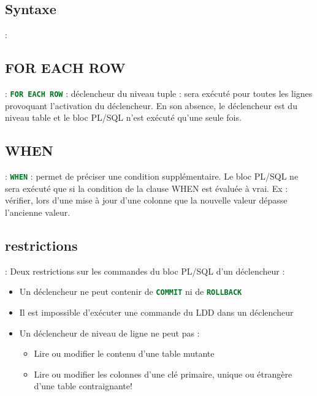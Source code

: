 \documentclass[10pt]{beamer}
\begin{document}
\subsection{Syntaxe}
\begin{frame}{\secname : \subsecname}
    
\end{frame}
\subsection{FOR EACH ROW}
\begin{frame}{\secname : \subsecname}
    \lstinline[language=sql]!FOR EACH ROW! : déclencheur du niveau tuple : sera exécuté pour toutes les lignes provoquant l'activation du déclencheur.  En son absence, le déclencheur est du niveau table et le bloc PL/SQL n'est exécuté qu'une seule fois.
\end{frame}

\subsection{WHEN}
\begin{frame}{\secname : \subsecname}
    \lstinline[language=sql]!WHEN! : permet de préciser une condition supplémentaire. Le bloc PL/SQL ne sera exécuté que si la condition de la clause WHEN est évaluée à vrai.
    Ex : vérifier, lors d'une mise à jour d'une colonne que la nouvelle valeur dépasse l'ancienne valeur.
\end{frame}

\subsection{restrictions}
\begin{frame}{\secname : \subsecname}
    Deux restrictions sur les commandes du bloc PL/SQL d'un déclencheur :
    \begin{itemize}
        \item Un déclencheur ne peut contenir de \lstinline[language=sql]!COMMIT! ni de \lstinline[language=sql]!ROLLBACK!
        \item Il est impossible d'exécuter une commande du LDD dans un déclencheur
        \item Un déclencheur  de niveau de ligne ne peut pas :
              \begin{itemize}
                  \item Lire ou modifier le contenu d'une table mutante
                  \item Lire ou modifier les colonnes d'une clé primaire, unique ou étrangère d'une table contraignante!
              \end{itemize}
    \end{itemize}
\end{frame}
\end{document}
